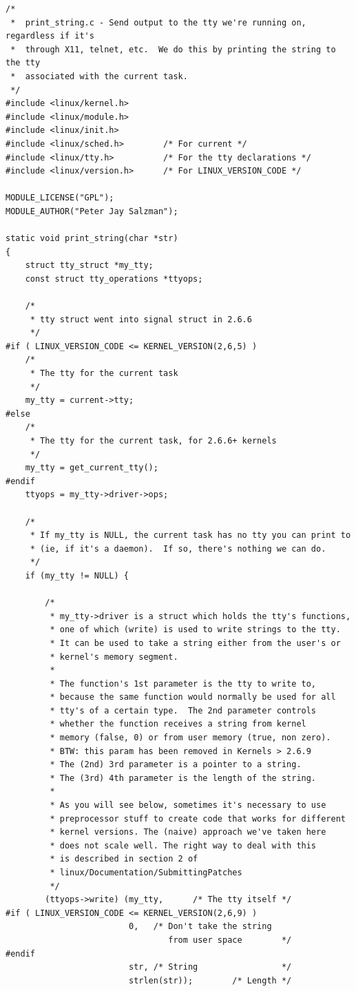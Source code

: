 \documentclass[11pt]{article}
\begin{document}
\begin{verbatim}
/*
 *  print_string.c - Send output to the tty we're running on, regardless if it's
 *  through X11, telnet, etc.  We do this by printing the string to the tty
 *  associated with the current task.
 */
#include <linux/kernel.h>
#include <linux/module.h>
#include <linux/init.h>
#include <linux/sched.h>        /* For current */
#include <linux/tty.h>          /* For the tty declarations */
#include <linux/version.h>      /* For LINUX_VERSION_CODE */

MODULE_LICENSE("GPL");
MODULE_AUTHOR("Peter Jay Salzman");

static void print_string(char *str)
{
    struct tty_struct *my_tty;
    const struct tty_operations *ttyops;

    /*
     * tty struct went into signal struct in 2.6.6
     */
#if ( LINUX_VERSION_CODE <= KERNEL_VERSION(2,6,5) )
    /*
     * The tty for the current task
     */
    my_tty = current->tty;
#else
    /*
     * The tty for the current task, for 2.6.6+ kernels
     */
    my_tty = get_current_tty();
#endif
    ttyops = my_tty->driver->ops;

    /*
     * If my_tty is NULL, the current task has no tty you can print to
     * (ie, if it's a daemon).  If so, there's nothing we can do.
     */
    if (my_tty != NULL) {

        /*
         * my_tty->driver is a struct which holds the tty's functions,
         * one of which (write) is used to write strings to the tty.
         * It can be used to take a string either from the user's or
         * kernel's memory segment.
         *
         * The function's 1st parameter is the tty to write to,
         * because the same function would normally be used for all
         * tty's of a certain type.  The 2nd parameter controls
         * whether the function receives a string from kernel
         * memory (false, 0) or from user memory (true, non zero).
         * BTW: this param has been removed in Kernels > 2.6.9
         * The (2nd) 3rd parameter is a pointer to a string.
         * The (3rd) 4th parameter is the length of the string.
         *
         * As you will see below, sometimes it's necessary to use
         * preprocessor stuff to create code that works for different
         * kernel versions. The (naive) approach we've taken here
         * does not scale well. The right way to deal with this
         * is described in section 2 of
         * linux/Documentation/SubmittingPatches
         */
        (ttyops->write) (my_tty,      /* The tty itself */
#if ( LINUX_VERSION_CODE <= KERNEL_VERSION(2,6,9) )
                         0,   /* Don't take the string
                                 from user space        */
#endif
                         str, /* String                 */
                         strlen(str));        /* Length */


\end{verbatim}
\end{document}
